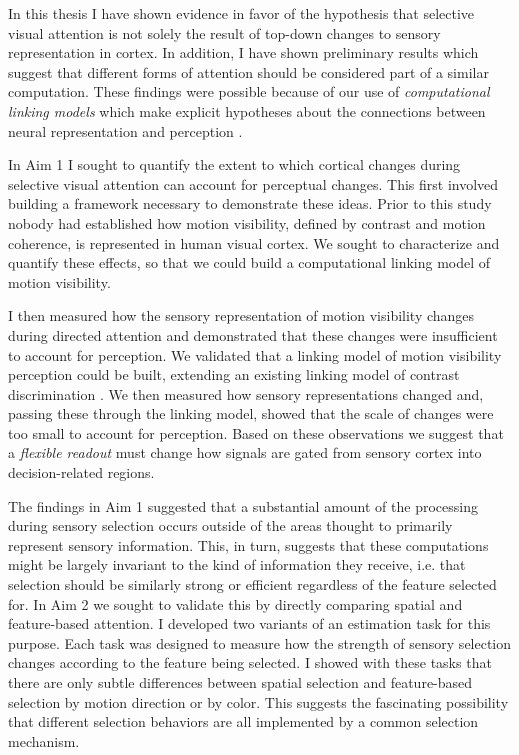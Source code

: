 
In this thesis I have shown evidence in favor of the hypothesis that selective visual attention is not solely the result of top-down changes to sensory representation in cortex. In addition, I have shown preliminary results which suggest that different forms of attention should be considered part of a similar computation. These findings were possible because of our use of \textit{computational linking models} which make explicit hypotheses about the connections between neural representation and perception \citep{Barlow1972-kz,Brindley1960-gq,Cohen2010-xs,Newsome1989-fr,Pestilli2011-gi}.

In Aim 1 I sought to quantify the extent to which cortical changes during selective visual attention can account for perceptual changes. This first involved building a framework necessary to demonstrate these ideas. Prior to this study nobody had established how motion visibility, defined by contrast and motion coherence, is represented in human visual cortex. We sought to characterize and quantify these effects, so that we could build a computational linking model of motion visibility. 

I then measured how the sensory representation of motion visibility changes during directed attention and demonstrated that these changes were insufficient to account for perception. We validated that a linking model of motion visibility perception could be built, extending an existing linking model of contrast discrimination \citep{Boynton1999-jd}. We then measured how sensory representations changed and, passing these through the linking model, showed that the scale of changes were too small to account for perception. Based on these observations we suggest that a \textit{flexible readout} must change how signals are gated from sensory cortex into decision-related regions.

The findings in Aim 1 suggested that a substantial amount of the processing during sensory selection occurs outside of the areas thought to primarily represent sensory information. This, in turn, suggests that these computations might be largely invariant to the kind of information they receive, i.e. that selection should be similarly strong or efficient regardless of the feature selected for. In Aim 2 we sought to validate this by directly comparing spatial and feature-based attention. I developed two variants of an estimation task for this purpose. Each task was designed to measure how the strength of sensory selection changes according to the feature being selected. I showed with these tasks that there are only subtle differences between spatial selection and feature-based selection by motion direction or by color. This suggests the fascinating possibility that different selection behaviors are all implemented by a common selection mechanism. 


